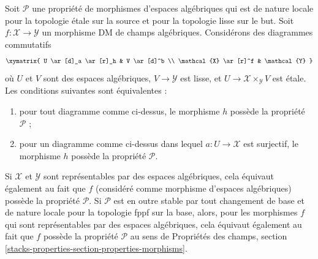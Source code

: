 \begin{lemma}
\label{lemma-etale-smooth-local-source-target}
Soit $\mathcal{P}$ une propriété de morphismes d'espaces algébriques
qui est de nature locale pour la topologie \'etale sur la source et pour la topologie lisse sur le but.
Soit $f : \mathcal{X} \to \mathcal{Y}$ un morphisme DM de champs algébriques.
Considérons des diagrammes commutatifs
$$
\xymatrix{
U \ar[d]_a \ar[r]_h & V \ar[d]^b \\
\mathcal{X} \ar[r]^f & \mathcal{Y}
}
$$
où $U$ et $V$ sont des espaces algébriques, $V \to \mathcal{Y}$ est lisse,
et $U \to \mathcal{X} \times_\mathcal{Y} V$ est \'etale.
Les conditions suivantes sont équivalentes :
\begin{enumerate}
\item pour tout diagramme comme ci-dessus, le morphisme $h$ possède la propriété $\mathcal{P}$ ;
\item pour un diagramme comme ci-dessus dans lequel $a : U \to \mathcal{X}$ est surjectif,
le morphisme $h$ possède la propriété $\mathcal{P}$.
\end{enumerate}
Si $\mathcal{X}$ et $\mathcal{Y}$ sont représentables par des espaces algébriques,
cela équivaut également au fait que $f$ (considéré comme morphisme d'espaces algébriques)
possède la propriété $\mathcal{P}$. Si $\mathcal{P}$ est en outre stable par
tout changement de base et de nature locale pour la topologie fppf sur la base, alors, pour les morphismes $f$
qui sont représentables par des espaces algébriques,
cela équivaut également au fait que $f$ possède la propriété $\mathcal{P}$ au sens
de
Propriétés des champs,
section \ref{stacks-properties-section-properties-morphisms}.
\end{lemma}

